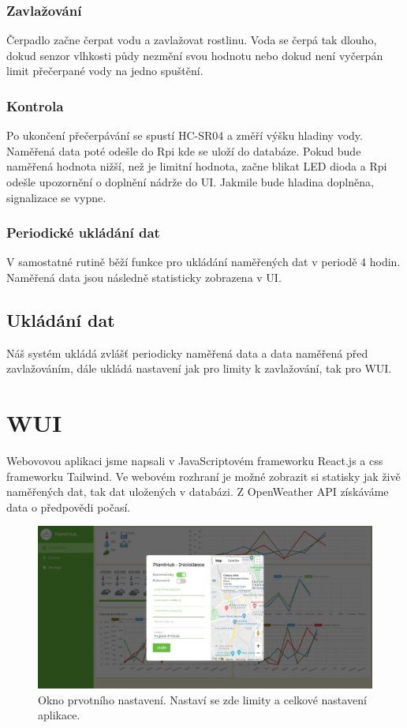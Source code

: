 \documentclass[11pt,a4paper]{article}
\begin{document}
\subsubsection{Zavlažování}

Čerpadlo začne čerpat vodu a zavlažovat rostlinu. Voda se čerpá tak dlouho,
dokud senzor vlhkosti půdy nezmění svou hodnotu nebo dokud není vyčerpán limit
přečerpané vody na jedno spuštění.

\subsubsection{Kontrola}

Po ukončení přečerpávání se spustí HC-SR04 a změří výšku hladiny vody. Naměřená
data poté odešle do Rpi kde se uloží do databáze. Pokud bude naměřená hodnota
nižší, než je limitní hodnota, začne blikat LED dioda a Rpi odešle upozornění o
doplnění nádrže do UI. Jakmile bude hladina doplněna, signalizace se vypne.

\subsubsection{Periodické ukládání dat}

V samostatné rutině běží funkce pro ukládání naměřených dat v periodě 4 hodin.
Naměřená data jsou následně statisticky zobrazena v UI.

\subsection{Ukládání dat}

Náš systém ukládá zvlášť periodicky naměřená data a data naměřená před
zavlažováním, dále ukládá nastavení jak pro limity k zavlažování, tak pro
WUI.

\clearpage

\section{WUI}

Webovovou aplikaci jsme napsali v JavaScriptovém frameworku React.js a css
frameworku Tailwind. Ve webovém rozhraní je možné zobrazit si statisky jak živě
naměřených dat, tak dat uložených v databázi. Z OpenWeather API získáváme data
o předpovědi počasí.

\begin{figure}[h]
	\centering
	\includegraphics[width=0.9\linewidth]{ui-inicializace.jpg}
	\caption{Okno prvotního nastavení. Nastaví se zde limity a celkové
		nastavení aplikace.}
\end{figure}
\end{document}
